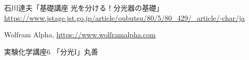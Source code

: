 
\begin{thebibliography}{99}
石川達夫「基礎講座 光を分ける！分光器の基礎」
\url{https://www.jstage.jst.go.jp/article/oubutsu/80/5/80_429/_article/-char/ja}


Wolfram Alpha, \url{https://www.wolframalpha.com}

実験化学講座6 「分光I」丸善
\end{thebibliography}


